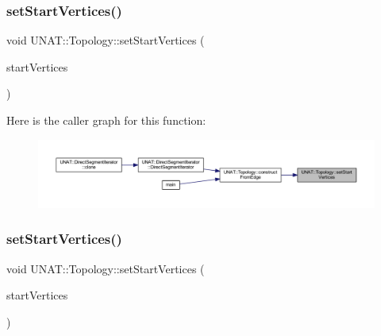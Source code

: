 \mbox{\label{classUNAT_1_1Topology_a59740da48119b1fe9cbc08ec61edd1c2}} 
\subsubsection{\texorpdfstring{setStartVertices()}{setStartVertices()}\hspace{0.1cm}{\footnotesize\ttfamily [1/3]}}
{\footnotesize\ttfamily void U\+N\+A\+T\+::\+Topology\+::set\+Start\+Vertices (\begin{DoxyParamCaption}\item[{\mbox{\hyperlink{include_2swMacro_8h_a113cf5f6b5377cdf3fac6aa4e443e9aa}{sw\+Int}} $\ast$}]{start\+Vertices }\end{DoxyParamCaption})\hspace{0.3cm}{\ttfamily [inline]}}

Here is the caller graph for this function\+:
\nopagebreak
\begin{figure}[H]
\begin{center}
\leavevmode
\includegraphics[width=350pt]{classUNAT_1_1Topology_a59740da48119b1fe9cbc08ec61edd1c2_icgraph}
\end{center}
\end{figure}
\mbox{\label{classUNAT_1_1Topology_a59740da48119b1fe9cbc08ec61edd1c2}} 
\subsubsection{\texorpdfstring{setStartVertices()}{setStartVertices()}\hspace{0.1cm}{\footnotesize\ttfamily [2/3]}}
{\footnotesize\ttfamily void U\+N\+A\+T\+::\+Topology\+::set\+Start\+Vertices (\begin{DoxyParamCaption}\item[{\mbox{\hyperlink{include_2swMacro_8h_a113cf5f6b5377cdf3fac6aa4e443e9aa}{sw\+Int}} $\ast$}]{start\+Vertices }\end{DoxyParamCaption})\hspace{0.3cm}{\ttfamily [inline]}}

